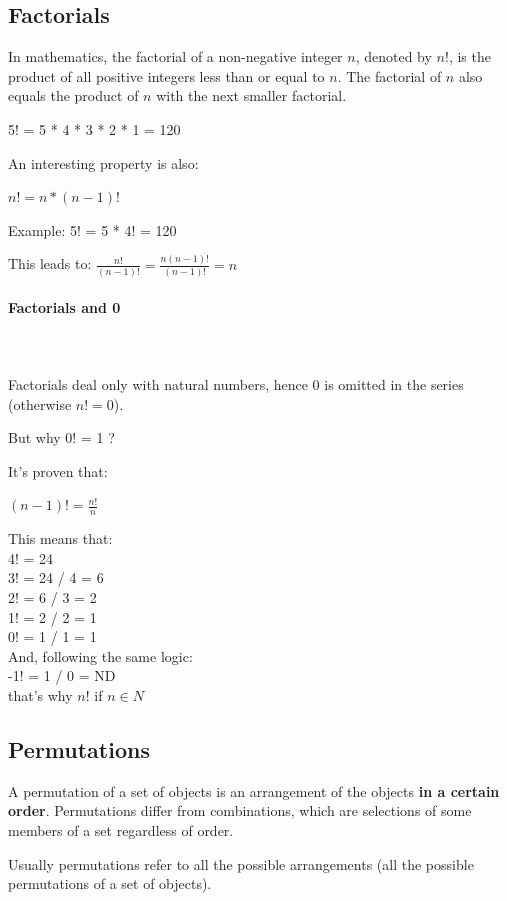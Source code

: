 \documentclass{article}
\begin{document}
\subsection{Factorials}
In mathematics, the factorial of a non-negative integer $n$, denoted by $n!$, is the product of all positive integers less than or equal to $n$. The factorial of $n$ also equals the product of $n$ with the next smaller factorial.

5! = 5 * 4 * 3 * 2 * 1 = 120

An interesting property is also:

$n! = n * (n-1)!$

Example:
5! = 5 * 4! = 120

This leads to:
$\frac{n!}{(n-1)!} = \frac{n(n-1)!}{(n-1)!} = n$

\paragraph{Factorials and 0}\mbox{} \\
\mbox{} \\
Factorials deal only with natural numbers, hence 0 is omitted in the series (otherwise $n! = 0$).

But why 0! = 1 ?

It’s proven that:

$(n-1)! = \frac{n!}{n}$

This means that: \\
4! = 24 \\
3! = 24 / 4 = 6 \\
2! = 6 / 3 = 2 \\
1! = 2 / 2 = 1 \\
0! = 1 / 1 = 1 \\

And, following the same logic: \\
-1! = 1 / 0 = ND \\

that’s why $n!$ if $n \in {N} $ 

\subsection{Permutations}
A permutation of a set of objects is an arrangement of the objects \textbf{in a certain order}. 
Permutations differ from combinations, which are selections of some members of a set regardless of order. 

Usually permutations refer to all the possible arrangements (all the possible permutations of a set of objects). 
\end{document}
